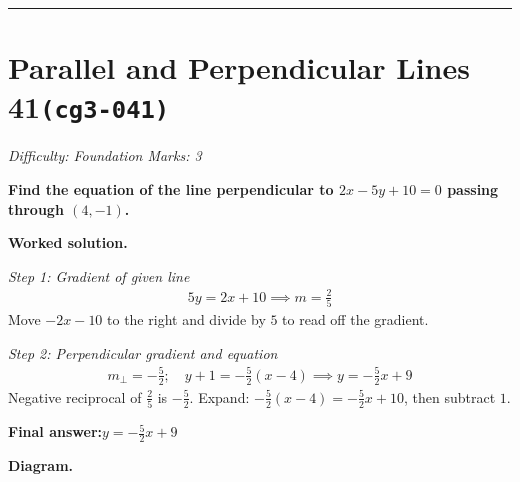 \documentclass[11pt]{article}
\newcommand{\question}[1]{\par\medskip\noindent\textbf{#1}\par}
\begin{document}
\medskip\hrule

\section*{Parallel and Perpendicular Lines 41\quad\small\texttt{(cg3-041)}}
\textit{Difficulty: Foundation \quad\textbar\quad Marks: 3}

\question{Find the equation of the line perpendicular to \( 2x - 5y + 10 = 0 \) passing through \( (4, -1) \).}

\textbf{Worked solution.}

\textit{Step 1: Gradient of given line}
\[\begin{gathered}
5y = 2x + 10 \implies m = \frac{2}{5}
\end{gathered}\]
Move \( -2x - 10 \) to the right and divide by \( 5 \) to read off the gradient.

\textit{Step 2: Perpendicular gradient and equation}
\[\begin{gathered}
m_{\perp} = -\frac{5}{2}; \quad y + 1 = -\frac{5}{2}(x - 4) \implies y = -\frac{5}{2}x + 9
\end{gathered}\]
Negative reciprocal of \( \tfrac{2}{5} \) is \( -\tfrac{5}{2} \). Expand: \( -\tfrac{5}{2}(x - 4) = -\tfrac{5}{2}x + 10 \), then subtract \( 1 \).

\begin{answerbox}
\textbf{Final answer:}\quad \(\displaystyle y = -\frac{5}{2}x + 9\)
\end{answerbox}
\textbf{Diagram.}
\end{document}
